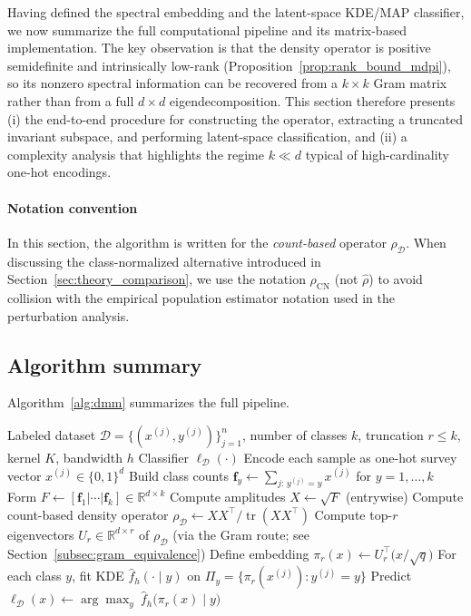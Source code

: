 \documentclass[preprint,11pt]{elsarticle}
\newcommand{\tr}{\operatorname{tr}}
\newcommand{\R}{\mathbb{R}}
\begin{document}
Having defined the spectral embedding and the latent-space KDE/MAP classifier, we now summarize the full computational pipeline and its matrix-based implementation. The key observation is that the density operator is positive semidefinite and intrinsically low-rank
(Proposition~\ref{prop:rank_bound_mdpi}), so its nonzero spectral information can be recovered from a $k\times k$ Gram matrix rather than from
a full $d\times d$ eigendecomposition. This section therefore presents (i) the end-to-end procedure for constructing the operator, extracting
a truncated invariant subspace, and performing latent-space classification, and (ii) a complexity analysis that highlights the regime
$k\ll d$ typical of high-cardinality one-hot encodings.

\paragraph{Notation convention}
In this section, the algorithm is written for the \emph{count-based} operator $\rho_{\mathcal D}$.
When discussing the class-normalized alternative introduced in Section~\ref{sec:theory_comparison}, we use the notation
$\rho_{\mathrm{CN}}$ (not $\widehat\rho$) to avoid collision with the empirical population estimator notation used in the perturbation analysis.

\subsection{Algorithm summary}
\label{subsec:algorithm_summary}

Algorithm~\ref{alg:dmm} summarizes the full pipeline.

\begin{algorithm}[H]
\caption{Density-Matrix Spectral Embedding + KDE Classification (count-based operator)}
\label{alg:dmm}
\begin{algorithmic}[1]
\Require Labeled dataset $\mathcal D=\{(x^{(j)},y^{(j)})\}_{j=1}^n$, number of classes $k$, truncation $r\le k$, kernel $K$, bandwidth $h$
\Ensure Classifier $\ell_{\mathcal D}(\cdot)$
\State Encode each sample as one-hot survey vector $x^{(j)}\in\{0,1\}^d$
\State Build class counts $\mathbf f_y\gets \sum_{j:\,y^{(j)}=y}x^{(j)}$ for $y=1,\dots,k$
\State Form $F\gets [\mathbf f_1|\cdots|\mathbf f_k]\in\R^{d\times k}$
\State Compute amplitudes $X\gets \sqrt{F}$ (entrywise)
\State Compute count-based density operator $\rho_{\mathcal D}\gets XX^\top/\tr(XX^\top)$
\State Compute top-$r$ eigenvectors $U_r\in\R^{d\times r}$ of $\rho_{\mathcal D}$ (via the Gram route; see Section~\ref{subsec:gram_equivalence})
\State Define embedding $\pi_r(x)\gets U_r^\top \bigl(x/\sqrt{q}\bigr)$
\State For each class $y$, fit KDE $\widehat f_h(\cdot\mid y)$ on $\Pi_y=\{\pi_r(x^{(j)}):y^{(j)}=y\}$
\State Predict $\ell_{\mathcal D}(x)\gets \arg\max_{y}\ \widehat f_h\bigl(\pi_r(x)\mid y\bigr)$
\end{algorithmic}
\end{algorithm}
\end{document}
